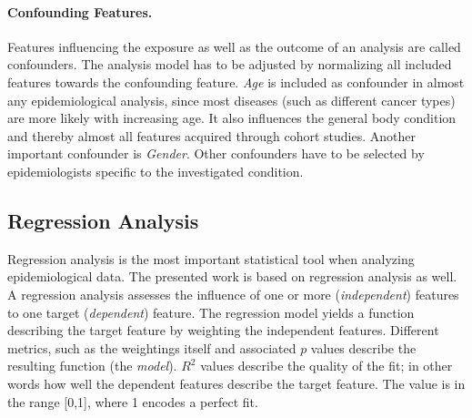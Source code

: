 \documentclass[journal]{style/vgtc} 			          %
\newcommand{\com}[1]{\textcolor{orange}{\uline{#1}}}
\begin{document}

\paragraph{Confounding Features.}
Features influencing the exposure as well as the outcome of an analysis are called confounders.
The analysis model has to be adjusted by normalizing all included features towards the confounding feature.
\emph{Age} is included as confounder in almost any epidemiological analysis, since most diseases (such as different cancer types) are more likely with increasing age.
It also influences the general body condition and thereby almost all features acquired through cohort studies.
Another important confounder is \emph{Gender}.
Other confounders have to be selected by epidemiologists specific to the investigated condition.

\subsection{Regression Analysis} \label{sec:RegressionAnalysis}
Regression analysis is the most important statistical tool when analyzing epidemiological data.
The presented work is based on regression analysis as well.
A regression analysis assesses the influence of one or more (\emph{independent}) features to one target (\emph{dependent}) feature.
The regression model yields a function describing the target feature by weighting the independent features.
Different metrics, such as the weightings itself and associated $p$ values describe the resulting function (the \emph{model}).
$R^2$ values describe the quality of the fit; in other words how well the dependent features describe the target feature.
The value is in the range [0,1], where 1 encodes a perfect fit.
\end{document}
